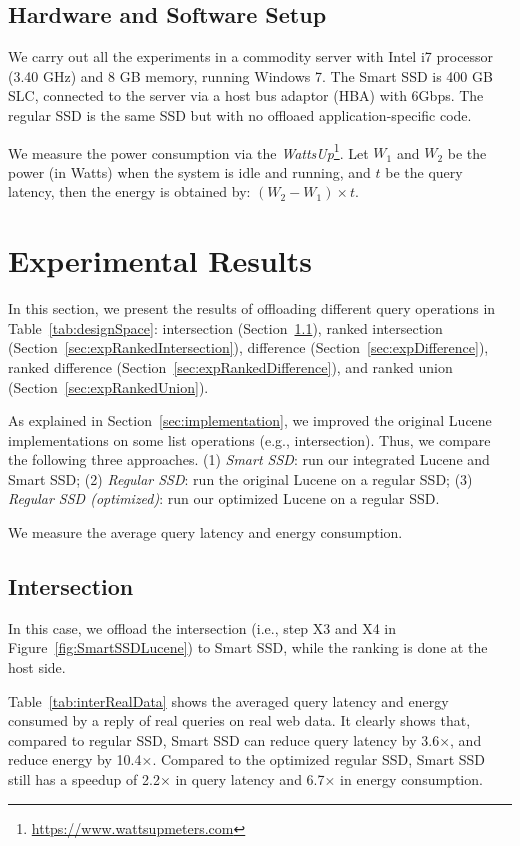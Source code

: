 \subsection{Hardware and Software Setup}\label{sec:hwswsetup}
We carry out all the experiments in a commodity server with Intel i7 processor (3.40 GHz) and 8 GB memory, running Windows 7.
The Smart SSD is 400 GB SLC, connected to the server via a host bus adaptor (HBA) with 6Gbps. The regular SSD is the same SSD but with no offloaed application-specific code.


We measure the power consumption via the \emph{WattsUp}\footnote{\url{https://www.wattsupmeters.com}}.
Let $W_1$ and $W_2$ be the power (in Watts) when the system is idle and running, and $t$ be the query latency, then the energy is obtained by: $(W_2-W_1)\times t$.
\section{Experimental Results}\label{sec:expResults}

In this section, we present the results of offloading different query operations in Table~\ref{tab:designSpace}: \textsf{intersection} (Section~\ref{sec:expIntersection}), \textsf{ranked intersection} (Section~\ref{sec:expRankedIntersection}),
\textsf{difference} (Section~\ref{sec:expDifference}), \textsf{ranked difference} (Section~\ref{sec:expRankedDifference}), and \textsf{ranked union} (Section~\ref{sec:expRankedUnion}).

As explained in Section~\ref{sec:implementation}, we improved the original Lucene implementations on some list operations (e.g., intersection). Thus, we compare the following three approaches. (1) \emph{Smart SSD}: run our integrated Lucene and Smart SSD; (2) \emph{Regular SSD}: run the original Lucene on a regular SSD; (3) \emph{Regular SSD (optimized)}: run our optimized Lucene on a regular SSD.

We measure the average query latency and energy consumption. %

\subsection{Intersection}\label{sec:expIntersection}
In this case, we offload the \textsf{intersection} (i.e., step X3 and X4 in Figure~\ref{fig:SmartSSDLucene}) to Smart SSD, while the ranking is done at the host side.


Table~\ref{tab:interRealData} shows the averaged query latency and energy consumed by a reply of real queries on real web data. It clearly shows that, compared to regular SSD, Smart SSD can reduce query latency by 3.6$\times$, and reduce energy by 10.4$\times$. Compared to the optimized regular SSD, Smart SSD still has a speedup of 2.2$\times$ in query latency and 6.7$\times$ in energy consumption.

